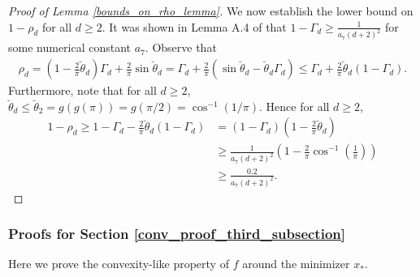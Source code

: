 \documentclass[11pt]{article}
\theoremstyle{remark}
\begin{document}
\begin{proof}[Proof of Lemma \ref{bounds_on_rho_lemma}]
We now establish the lower bound on $1-\rho_d$ for all $d \geqslant 2$. It was shown in Lemma A.4 of \cite{Huangetal2018} that $1-\Gamma_d \geqslant \frac{1}{a_7(d+2)^2}$ for some numerical constant $a_7$. Observe that \begin{align*}
    \rho_d = \left(1 - \frac{2}{\pi}\breve{\theta}_d\right)\Gamma_d + \frac{2}{\pi}\sin \breve{\theta}_d = \Gamma_d + \frac{2}{\pi}\left(\sin \breve{\theta}_d - \breve{\theta}_d\Gamma_d\right) \leqslant \Gamma_d + \frac{2}{\pi}\breve{\theta}_d (1-\Gamma_d). 
\end{align*} Furthermore, note that for all $d \geqslant 2$, $\breve{\theta}_d \leqslant \breve{\theta}_2 = g(g(\pi)) = g(\pi/2) = \cos^{-1}(1/\pi).$ Hence for all $d \geqslant 2$, \begin{align*}
    1 - \rho_d 
    \geqslant 1- \Gamma_d - \frac{2}{\pi}\breve{\theta}_d(1-\Gamma_d) 
    & = (1-\Gamma_d) \left(1 - \frac{2}{\pi}\breve{\theta}_d\right) \\
    & \geqslant \frac{1}{a_7(d+2)^2}\left(1 - \frac{2}{\pi}\cos^{-1}\left(\frac{1}{\pi}\right)\right) \\
    & \geqslant \frac{0.2}{a_7(d+2)^2}.
\end{align*}
\end{proof}

\subsubsection{Proofs for Section \ref{conv_proof_third_subsection}} \label{proof_of_convexity_lemma_subsection}

Here we prove the convexity-like property of $f$ around the minimizer $x_*$.
\end{document}
